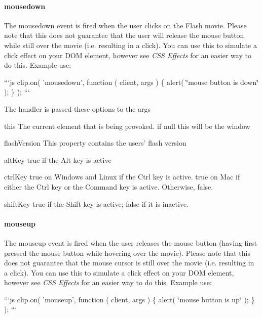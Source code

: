 \paragraph*{mousedown}

The {\ttfamily mousedown} event is fired when the user clicks on the Flash movie. Please note that this does not guarantee that the user will release the mouse button while still over the movie (i.\-e. resulting in a click). You can use this to simulate a click effect on your D\-O\-M element, however see {\itshape C\-S\-S Effects} for an easier way to do this. Example use\-:

```js clip.\-on( 'mousedown', function ( client, args ) \{ alert( \char`\"{}mouse button is down\char`\"{} ); \} ); ```

The handler is passed these options to the {\ttfamily args}


\begin{DoxyDescription}
\item[this ]The current element that is being provoked. if null this will be the window 
\item[flash\-Version ]This property contains the users' flash version 
\item[alt\-Key ]{\ttfamily true} if the Alt key is active 
\item[ctrl\-Key ]{\ttfamily true} on Windows and Linux if the Ctrl key is active. {\ttfamily true} on Mac if either the Ctrl key or the Command key is active. Otherwise, {\ttfamily false}. 
\item[shift\-Key ]{\ttfamily true} if the Shift key is active; {\ttfamily false} if it is inactive. 
\end{DoxyDescription}

\paragraph*{mouseup}

The {\ttfamily mouseup} event is fired when the user releases the mouse button (having first pressed the mouse button while hovering over the movie). Please note that this does not guarantee that the mouse cursor is still over the movie (i.\-e. resulting in a click). You can use this to simulate a click effect on your D\-O\-M element, however see {\itshape C\-S\-S Effects} for an easier way to do this. Example use\-:

```js clip.\-on( 'mouseup', function ( client, args ) \{ alert( \char`\"{}mouse button is up\char`\"{} ); \} ); ```


